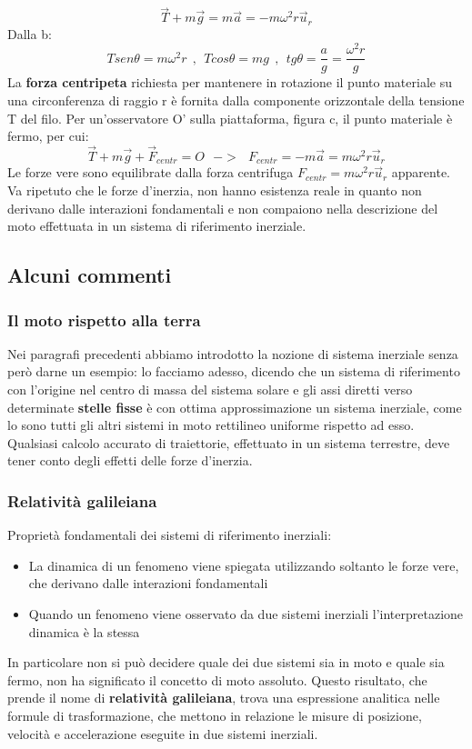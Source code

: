 \documentclass{article}
\numberwithin{equation}{subsection}
\begin{document}
\begin{equation}
    \vec{T}+m\vec{g}=m\vec{a}=-m\omega^2r\vec{u}_r
\end{equation}
Dalla b:
\begin{equation}
    Tsen\theta=m\omega^2r \ \ , \ \ Tcos\theta=mg \ \ , \  \ tg\theta=\frac{a}{g}=\frac{\omega^2r}{g}
\end{equation}
La \textbf{forza centripeta} richiesta per mantenere in rotazione il punto materiale su una circonferenza di raggio r è fornita dalla componente orizzontale della tensione T del filo. Per un'osservatore O' sulla piattaforma, figura c, il punto materiale è fermo, per cui:
\begin{equation}
    \vec{T}+m\vec{g}+\vec{F}_{centr}=O \ \ \ -> \ \ \ F_{centr}=-m\vec{a}=m\omega^2r\vec{u}_r
    \end{equation}
Le forze vere sono equilibrate dalla forza centrifuga $F_{centr}=m\omega^2r\vec{u}_r$ apparente. Va ripetuto che le forze d'inerzia, non hanno esistenza reale in quanto non derivano dalle interazioni fondamentali e non compaiono nella descrizione del moto effettuata in un sistema di riferimento inerziale.
\subsection{Alcuni commenti}
\subsubsection{Il moto rispetto alla terra}
Nei paragrafi precedenti abbiamo introdotto la nozione di sistema inerziale senza però darne un esempio: lo facciamo adesso, dicendo che un sistema di riferimento con l'origine nel centro di massa del sistema solare e gli assi diretti verso determinate \textbf{stelle fisse} è con ottima approssimazione un sistema inerziale, come lo sono tutti gli altri sistemi in moto rettilineo uniforme rispetto ad esso. Qualsiasi calcolo accurato di traiettorie, effettuato in un sistema terrestre, deve tener conto degli effetti delle forze d'inerzia.
\subsubsection{Relatività galileiana}
Proprietà fondamentali dei sistemi di riferimento inerziali:
\begin{itemize}
    \item La dinamica di un fenomeno viene spiegata utilizzando soltanto le forze vere, che derivano dalle interazioni fondamentali
    \item Quando un fenomeno viene osservato da due sistemi inerziali l'interpretazione dinamica è la stessa
\end{itemize}
In particolare non si può decidere quale dei due sistemi sia in moto e quale sia fermo, non ha significato il concetto di moto assoluto. Questo risultato, che prende il nome di \textbf{relatività galileiana}, trova una espressione analitica nelle formule di trasformazione, che mettono in relazione le misure di posizione, velocità e accelerazione eseguite in due sistemi inerziali.
\end{document}
